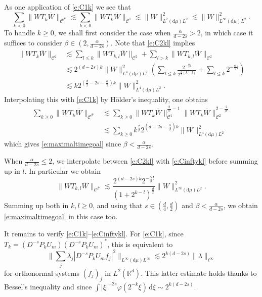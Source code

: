 \documentclass[a4paper]{amsart}
\numberwithin{equation}{section}%
\theoremstyle{plain}%
\theoremstyle{definition}
\theoremstyle{remark}%
\def\d{\mathrm{d}}
\def\C{\mathcal{C}}
\def\C{\mathcal{C}}
\begin{document}
As one application of \eqref{e:C1k} we see that
\begin{equation*} 
\sum_{k < 0} \|WT_k\overline{W}\|_{\C^{\beta'}} \lesssim \sum_{k < 0} \|WT_k\overline{W}\|_{\C^1} \lesssim \|W\|_{L^2(\d\mu) L^2}^2 \lesssim \|W\|_{L^\infty(\d\mu) L^2}^2.
\end{equation*}
To handle $k\geq0$, we shall first consider the case when $\frac{\alpha}{d-2s}>2$, in which case it suffices to consider $\beta \in (2,\frac{\alpha}{d-2s})$. Note that \eqref{e:C2kl} implies
\begin{align*}
\|WT_k\overline{W}\|_{\C^2}
&\lesssim
\sum_{l\leq k}\|WT_{k,l}\overline{W} \|_{\C^2}
+
\sum_{l>k}\|WT_{k,l}\overline{W}\|_{\C^2}\\
&\lesssim
2^{(d-2s)k}\|W\|_{L^4(\d\mu)L^2}^2
\left(
\sum_{l\leq k}\frac{2^{-\frac\alpha2 l}}{2^{\frac d2(k-l)}}
+
\sum_{l\leq k}2^{-\frac\alpha2 l}
\right)\\
&\lesssim
k2^{(\frac d2-2s-\frac{\alpha}{2})k}\|W\|_{L^4(\d\mu)L^2}^2.
\end{align*}
Interpolating this with \eqref{e:C1k} by H\"older's inequality, one obtains 
\begin{align*}
    \sum_{k\geq0} \|WT_k\overline{W}\|_{\C^{\beta'}}
    & \lesssim
    \sum_{k\geq0} \|WT_k\overline{W}\|_{\C^1}^{\frac{2}{\beta'}-1}     \|WT_k\overline{W}\|_{\C^2}^{2-\frac{2}{\beta'}} \\
    & \lesssim \sum_{k\geq0} k^{\frac{2}{\beta}} 2^{(d-2s - \frac{\alpha}{\beta})k} \|W\|_{L^4(\d\mu)L^2}^2
\end{align*}
which gives \eqref{e:maximaltimegoal} since $\beta < \frac{\alpha}{d - 2s}$. 

When $\frac{\alpha}{d-2s}\leq 2$, we interpolate between \eqref{e:C2kl} with \eqref{e:Cinftykl} before summing up in $l$. In particular we obtain 
\[
\|WT_{k,l}\overline{W} \|_{\C^{\beta'}}
\lesssim
\frac{2^{(d-2s)k}2^{-\frac\alpha\beta l}}{(1+2^{k-l})^\frac d2} \|W\|_{L^\infty(\d\mu)L^2}^2.
\]
Summing up both in $k,l\geq0$, and using that $s \in (\frac{d}{4},\frac{d}{2})$ and $\beta < \frac{\alpha}{d-2s}$, we obtain \eqref{e:maximaltimegoal} in this case too.

It remains to verify \eqref{e:C1k}--\eqref{e:Cinftykl}. For \eqref{e:C1k}, since $T_k = (D^{-s}P_kU_m)(D^{-s}P_kU_m)^*$, this is equivalent to
\[
\bigg\|\sum_j\lambda_j|D^{-s}P_kU_mf_j|^2\bigg\|_{L^\infty(\d\mu)L^\infty}
\lesssim
2^{k(d-2s)}\|\lambda\|_{\ell^\infty}
\]
for orthonormal systems $(f_j)_j$ in $L^2(\mathbb{R}^d)$. This latter estimate holds thanks to Bessel's inequality and since $\int |\xi|^{-2s} \varphi(2^{-k}\xi) \, \mathrm{d}\xi \sim 2^{k(d-2s)}$.
\end{document}
